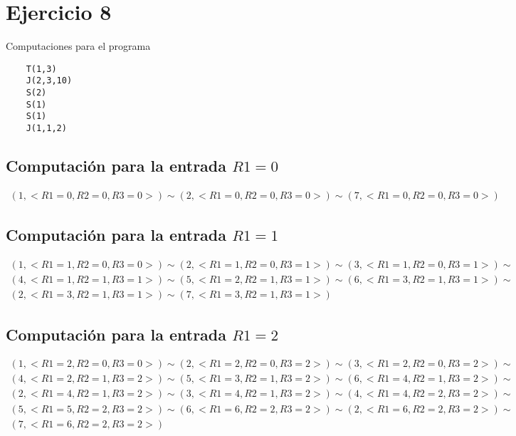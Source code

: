 \section{Ejercicio 8}
	Computaciones para el programa
	\begin{verbatim}
	T(1,3)
	J(2,3,10)
	S(2)
	S(1)
	S(1)
	J(1,1,2)
	\end{verbatim}
	\subsection{Computación para la entrada $R1=0$}
	\begin{equation*}\begin{gathered}
	(1, <R1=0, R2=0, R3=0>) \sim (2, <R1=0, R2=0, R3=0>) \sim (7, <R1=0, R2=0, R3=0>)
	\end{gathered}\end{equation*}
	\subsection{Computación para la entrada $R1=1$}
	\begin{equation*}\begin{gathered}
	(1, <R1=1, R2=0, R3=0>) \sim (2, <R1=1, R2=0, R3=1>) \sim (3, <R1=1, R2=0, R3=1>) \sim\\
	(4, <R1=1, R2=1, R3=1>) \sim (5, <R1=2, R2=1, R3=1>) \sim (6, <R1=3, R2=1, R3=1>) \sim\\
	(2, <R1=3, R2=1, R3=1>) \sim (7, <R1=3, R2=1, R3=1>)
	\end{gathered}\end{equation*}
	\subsection{Computación para la entrada $R1=2$}
	\begin{equation*}\begin{gathered}
	(1, <R1=2, R2=0, R3=0>) \sim (2, <R1=2, R2=0, R3=2>) \sim (3, <R1=2, R2=0, R3=2>) \sim\\
	(4, <R1=2, R2=1, R3=2>) \sim (5, <R1=3, R2=1, R3=2>) \sim (6, <R1=4, R2=1, R3=2>) \sim\\
	(2, <R1=4, R2=1, R3=2>) \sim (3, <R1=4, R2=1, R3=2>) \sim (4, <R1=4, R2=2, R3=2>) \sim\\
	(5, <R1=5, R2=2, R3=2>) \sim (6, <R1=6, R2=2, R3=2>) \sim (2, <R1=6, R2=2, R3=2>) \sim\\
	(7, <R1=6, R2=2, R3=2>)
	\end{gathered}\end{equation*}
